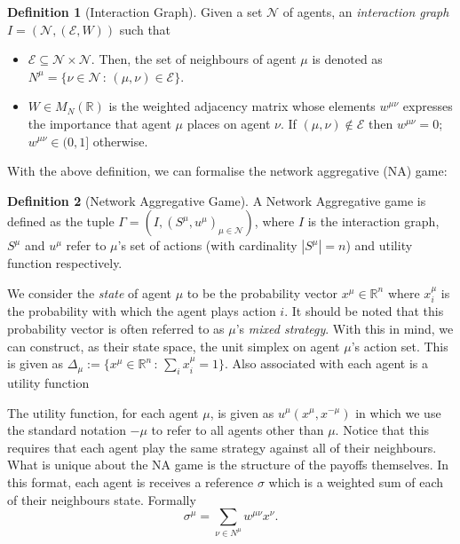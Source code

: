 \documentclass{article}
\theoremstyle{definition}
\newtheorem*{definition}{Definition}
\newcommand{\agentset}{\mathcal{N}}
\newcommand{\edgeset}{\mathcal{E}}
\newcommand{\weightset}{W}
\newcommand{\actionset}[1]{S^{#1}}
\newcommand{\utility}[1]{u^{#1}}
\newcommand{\wmunu}{w^{\mu \nu}}
\newcommand{\xmu}{x^{\mu}}
\newcommand{\xnu}{x^{\nu}}
\newcommand{\xnotmu}{x^{-\mu}}
\newcommand{\xmuaction}[1]{x^{\mu}_{#1}}
\begin{document}
	\begin{definition}[Interaction Graph]
		Given a set $\agentset$ of agents, an {\em interaction graph} $I = (\agentset, (\edgeset,
		\weightset))$ such that
		\begin{itemize}
		\item $\edgeset \subseteq \agentset \times \agentset$.        Then, the set of neighbours of agent
				$\mu$ is denoted as $N^\mu = \{\nu \in \agentset \, : \, (\mu, \nu) \in \edgeset\}$.
			\item $\weightset \in M_N(\mathbb{R})$ is the weighted adjacency matrix whose elements $w^{\mu
				\nu}$ expresses the importance that agent $\mu$ places on agent $\nu$. If $(\mu, \nu) \not
				\in \edgeset$ then $w^{\mu \nu} = 0$;        $\wmunu \in (0, 1]$ otherwise.
		\end{itemize}
	\end{definition}

	With the above definition, we can formalise the network aggregative (NA) game:
	
	\begin{definition}[Network Aggregative Game]
		A Network Aggregative game is defined as the tuple $\Gamma = (I, (\actionset{\mu},
        \utility{\mu})_{\mu \in \mathcal{N}})$, where $I$ is the interaction graph,
        $\actionset{\mu}$ and $\utility{\mu}$ refer to $\mu$'s set of actions (with cardinality
        $|\actionset{\mu}| = n$) and utility function respectively.
	\end{definition}

	We consider the \emph{state} of agent $\mu$ to be the probability vector $\xmu \in
	\mathbb{R}^n$ where $\xmu_i$ is the probability with which the agent plays action $i$. It
	should be noted that this probability vector is often referred to as $\mu$'s \emph{mixed
	strategy}. With this in mind, we can construct, as their state space, the unit simplex on
	agent $\mu$'s action set. This is given as $\Delta_\mu := \{\xmu \in \mathbb{R}^n \, : \,
	\sum_i \xmuaction{i} = 1\}$. Also associated with each agent is a utility function

	The utility function, for each agent $\mu$, is given as $u^\mu(\xmu, \xnotmu)$ in which we use
	the standard notation $-\mu$ to refer to all agents other than $\mu$. Notice that this requires
	that each agent play the same strategy against all of their neighbours. What is unique about the
	NA game is the structure of the payoffs themselves. In this format, each agent is receives a
	reference $\sigma$ which is a weighted sum of each of their neighbours
	state. Formally
%
	\begin{equation}
		\sigma^\mu = \sum_{\nu \in N^\mu} \wmunu \xnu.
	\end{equation}
\end{document}
